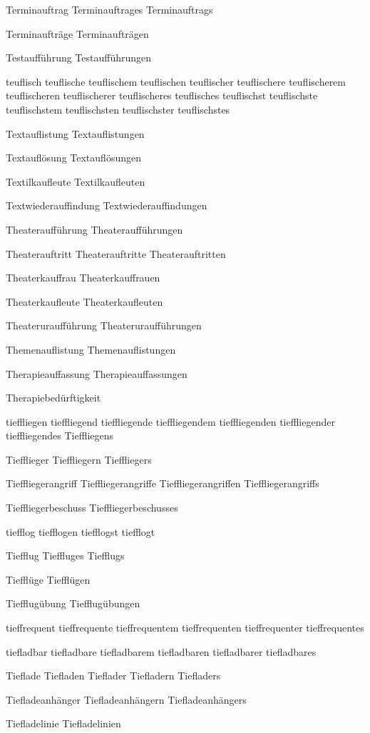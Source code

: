 Terminauftrag
Terminauftrages
Terminauftrags

Terminaufträge
Terminaufträgen

Testaufführung
Testaufführungen

teuflisch
teuflische
teuflischem
teuflischen
teuflischer
teuflischere
teuflischerem
teuflischeren
teuflischerer
teuflischeres
teuflisches
teuflischst
teuflischste
teuflischstem
teuflischsten
teuflischster
teuflischstes

Textauflistung
Textauflistungen

Textauflösung
Textauflösungen

Textilkaufleute
Textilkaufleuten

Textwiederauffindung
Textwiederauffindungen

Theateraufführung
Theateraufführungen

Theaterauftritt
Theaterauftritte
Theaterauftritten

Theaterkauffrau
Theaterkauffrauen

Theaterkaufleute
Theaterkaufleuten

Theateruraufführung
Theateruraufführungen

Themenauflistung
Themenauflistungen

Therapieauffassung
Therapieauffassungen

Therapiebedürftigkeit

tieffliegen
tieffliegend
tieffliegende
tieffliegendem
tieffliegenden
tieffliegender
tieffliegendes
Tieffliegens

Tiefflieger
Tieffliegern
Tieffliegers

Tieffliegerangriff
Tieffliegerangriffe
Tieffliegerangriffen
Tieffliegerangriffs

Tieffliegerbeschuss
Tieffliegerbeschusses

tiefflog
tiefflogen
tiefflogst
tiefflogt

Tiefflug
Tieffluges
Tiefflugs

Tiefflüge
Tiefflügen

Tiefflugübung
Tiefflugübungen

tieffrequent
tieffrequente
tieffrequentem
tieffrequenten
tieffrequenter
tieffrequentes

tiefladbar
tiefladbare
tiefladbarem
tiefladbaren
tiefladbarer
tiefladbares

Tieflade
Tiefladen
Tieflader
Tiefladern
Tiefladers

Tiefladeanhänger
Tiefladeanhängern
Tiefladeanhängers

Tiefladelinie
Tiefladelinien

